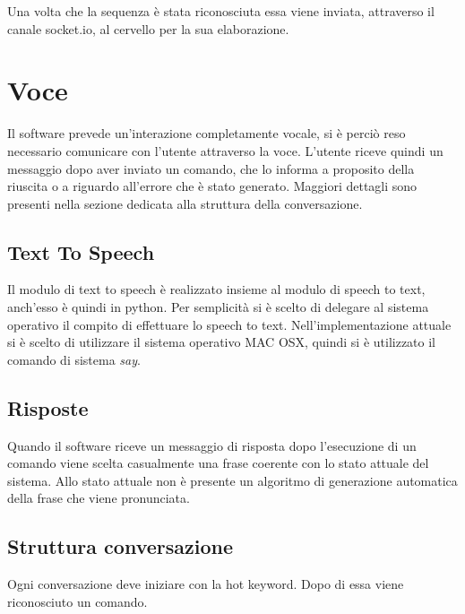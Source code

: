 \documentclass[twoside]{supsistudent}
\begin{document}
Una volta che la sequenza è stata riconosciuta essa viene inviata, attraverso il canale socket.io, al cervello per la sua elaborazione.

\chapter{Voce}

Il software prevede un'interazione completamente vocale, si è perciò reso necessario comunicare con l'utente attraverso la voce.
L'utente riceve quindi un messaggio dopo aver inviato un comando, che lo informa a proposito della riuscita o a riguardo all'errore che è stato generato. Maggiori dettagli sono presenti nella sezione dedicata alla struttura della conversazione.
\section{Text To Speech}
Il modulo di text to speech è realizzato insieme al modulo di speech to text, anch'esso è quindi in python. Per semplicità si è scelto di delegare al sistema operativo il compito di effettuare lo speech to text. Nell'implementazione attuale si è scelto di utilizzare il sistema operativo MAC OSX, quindi si è utilizzato il comando di sistema \textit{say}.

\section{Risposte}
Quando il software riceve un messaggio di risposta dopo l'esecuzione di un comando viene scelta casualmente una frase coerente con lo stato attuale del sistema.
Allo stato attuale non è presente un algoritmo di generazione automatica della frase che viene pronunciata.
\section{Struttura conversazione}

Ogni conversazione deve iniziare con la hot keyword. Dopo di essa viene riconosciuto un comando.
\end{document}
